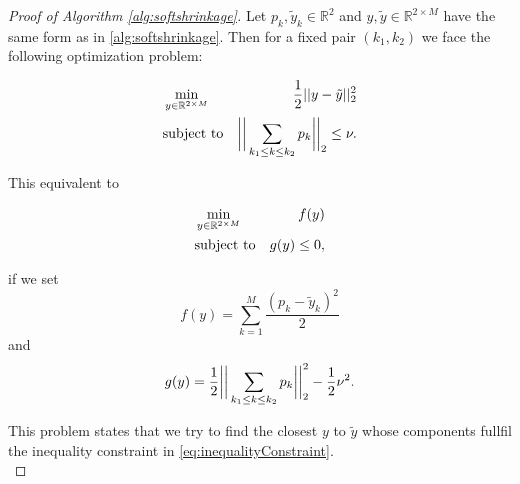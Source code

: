    \begin{proof}[Proof of Algorithm \ref{alg:softshrinkage}]
        Let $p_{k}, \tilde{y}_{k} \in \mathbb{R}^{2}$ and $y, \tilde{y} \in \mathbb{R}^{2 \times M}$ have the same form as in \ref{alg:softshrinkage}. Then for a fixed pair $(k_{1}, k_{2})$ we face the following optimization problem: %

        \begin{eqnarray}
            &\min\limits_{y \in \mathbb{R}^{2 \times M}}& \frac{1}{2} ||y - \tilde{y}||^{2}_{2} \notag \\
            &\textnormal{subject to}& \bigg{|} \bigg{|} \sum_{k_{1} \le k \le k_{2}} p_{k} \bigg{|} \bigg{|}_{2} \le \nu. \notag
        \end{eqnarray}

        This equivalent to

        \begin{eqnarray}
            &\min\limits_{y \in \mathbb{R}^{2 \times M}}& f(y) \notag \\
            &\textnormal{subject to}& g(y) \le 0, \label{eq:inequalityConstraint}
        \end{eqnarray}

        if we set
            $$f(y) = \sum_{k = 1}^{M} \frac{(p_{k} - \tilde{y}_{k})^{2}}{2}$$
        and
            $$g(y) = \frac{1}{2} \bigg{|} \bigg{|} \sum_{k_{1} \le k \le k_{2}} p_{k} \bigg{|} \bigg{|}_{2}^{2} - \frac{1}{2} \nu^{2}.$$

        This problem states that we try to find the closest $y$ to $\tilde{y}$ whose components fullfil the inequality constraint in \ref{eq:inequalityConstraint}.\\



\end{proof}

